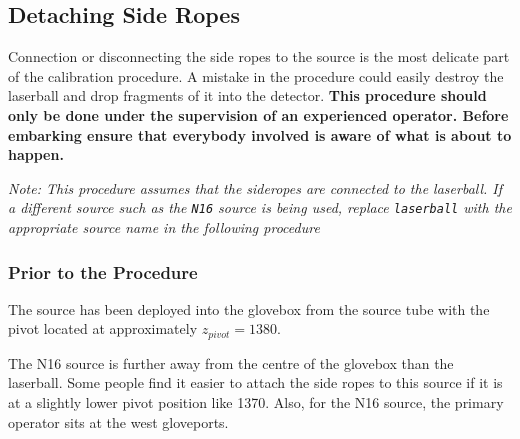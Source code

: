 \documentclass[11pt]{article}
\begin{document}
\begin{enumarate}
\subsection{Detaching Side Ropes}

Connection or disconnecting the side ropes to the source is the most delicate part of the calibration procedure. A mistake in the procedure could easily destroy the laserball and drop fragments of it into the detector. {\bf This procedure should only be done under the supervision of an experienced operator. Before embarking ensure that everybody involved is aware of what is about to happen.}

{\it  Note: This procedure assumes that the sideropes  are connected to the laserball. If a different source such as the \verb+N16+ source is being used, replace \verb+laserball+ with the appropriate source name in the following procedure}

\subsubsection{Prior to the Procedure}
 The source has been deployed into the glovebox from the source tube with the pivot located at approximately $z_{pivot}=1380$.

The N16 source is further away from the centre of the glovebox than the laserball. Some people find it easier to attach the side ropes to this source if it is at a slightly lower pivot position like 1370. Also, for the N16 source, the primary operator sits at the west gloveports.


\end{enumarate}
\end{document}
